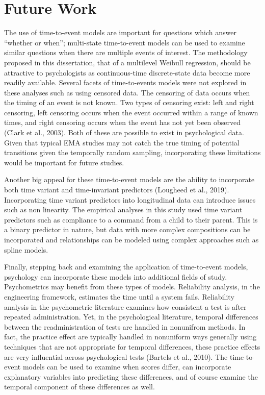 \documentclass[12pt]{./styles/outhesis}
\begin{document}
\section{Future Work}
The use of time-to-event models are important for questions which answer
``whether or when''; multi-state time-to-event models can be used to
examine similar questions when there are multiple events of interest.
The methodology proposed in this dissertation, that of a multilevel
Weibull regression, should be attractive to psychologists as
continuous-time discrete-state data become more readily available.
Several facets of time-to-events models were not explored in these
analyses such as using censored data. The censoring of data occurs when
the timing of an event is not known. Two types of censoring exist: left
and right censoring, left censoring occurs when the event occurred
within a range of known times, and right censoring occurs when the event
has not yet been observed (Clark et al., 2003). Both of these are
possible to exist in psychological data. Given that typical EMA studies
may not catch the true timing of potential transitions given the
temporally random sampling, incorporating these limitations would be
important for future studies.

Another big appeal for these time-to-event models are the ability to
incorporate both time variant and time-invariant predictors (Lougheed et
al., 2019). Incorporating time variant predictors into longitudinal data
can introduce issues such as non linearity. The empirical analyses in
this study used time variant predictors such as compliance to a command
from a child to their parent. This is a binary predictor in nature, but
data with more complex compositions can be incorporated and
relationships can be modeled using complex approaches such as spline
models.

Finally, stepping back and examining the application of time-to-event
models, psychology can incorporate these models into additional fields
of study. Psychometrics may benefit from these types of models.
Reliability analysis, in the engineering framework, estimates the time
until a system fails. Reliability analysis in the psychometric
literature examines how consistent a test is after repeated
administration. Yet, in the psychological literature, temporal
differences between the readministration of tests are handled in
nonunifrom methods. In fact, the practice effect are typically handled in nonuniform ways generally using techniques that are not appropriate for temporal differences, these practice effects are
very influential across psychological tests (Bartels et al., 2010). The
time-to-event models can be used to examine when scores differ, can
incorporate explanatory variables into predicting these differences, and
of course examine the temporal component of these differences as well.
\end{document}
